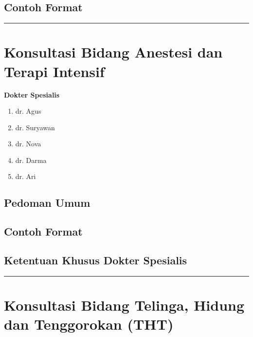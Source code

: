 \documentclass[
]{book}
\providecommand{\tightlist}{%
  \setlength{\itemsep}{0pt}\setlength{\parskip}{0pt}}
\begin{document}
\hypertarget{contoh-format-4}{%
\subsection{Contoh Format}\label{contoh-format-4}}

\begin{center}\rule{0.5\linewidth}{0.5pt}\end{center}

\hypertarget{konsultasi-bidang-anestesi-dan-terapi-intensif}{%
\section{Konsultasi Bidang Anestesi dan Terapi Intensif}\label{konsultasi-bidang-anestesi-dan-terapi-intensif}}

\textbf{Dokter Spesialis}

\begin{enumerate}
\def\labelenumi{\arabic{enumi}.}
\tightlist
\item
  dr. Agus
\item
  dr. Suryawan
\item
  dr. Nova
\item
  dr. Darma
\item
  dr. Ari
\end{enumerate}

\hypertarget{pedoman-umum-5}{%
\subsection{Pedoman Umum}\label{pedoman-umum-5}}

\hypertarget{contoh-format-5}{%
\subsection{Contoh Format}\label{contoh-format-5}}

\hypertarget{ketentuan-khusus-dokter-spesialis-3}{%
\subsection{Ketentuan Khusus Dokter Spesialis}\label{ketentuan-khusus-dokter-spesialis-3}}

\begin{center}\rule{0.5\linewidth}{0.5pt}\end{center}

\hypertarget{konsultasi-bidang-telinga-hidung-dan-tenggorokan-tht}{%
\section{Konsultasi Bidang Telinga, Hidung dan Tenggorokan (THT)}\label{konsultasi-bidang-telinga-hidung-dan-tenggorokan-tht}}
\end{document}

